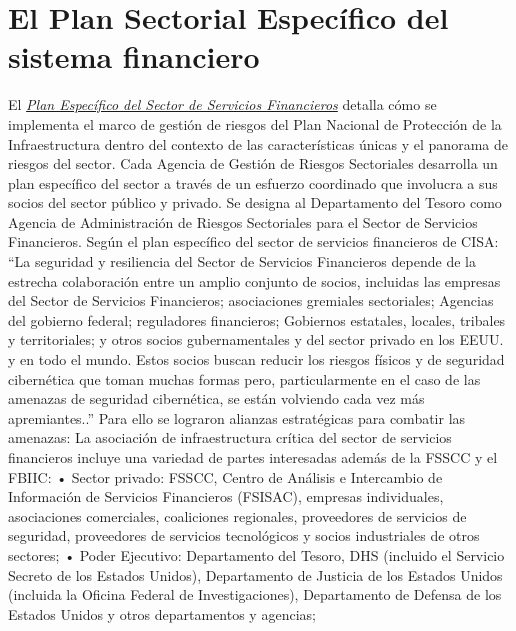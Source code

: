 \documentclass{article}
\begin{document}
\section{El Plan Sectorial Específico del sistema financiero}
El \href{https://www.cisa.gov/publication/nipp-ssp-financial-services-2015}{\textit{Plan Específico del Sector de Servicios Financieros}} detalla cómo se implementa el marco de gestión de riesgos del Plan Nacional de Protección de la Infraestructura dentro del contexto de las características únicas y el panorama de riesgos del sector. Cada Agencia de Gestión de Riesgos Sectoriales desarrolla un plan específico del sector a través de un esfuerzo coordinado que involucra a sus socios del sector público y privado. Se designa al Departamento del Tesoro como Agencia de Administración de Riesgos Sectoriales para el Sector de Servicios Financieros.
 \newline
Según el plan específico del sector de servicios financieros de CISA: 
\newline
“La seguridad y resiliencia del Sector de Servicios Financieros depende de la estrecha colaboración entre un amplio conjunto de socios, incluidas las empresas del Sector de Servicios Financieros; asociaciones gremiales sectoriales; Agencias del gobierno federal; reguladores financieros; Gobiernos estatales, locales, tribales y territoriales; y otros socios gubernamentales y del sector privado en los EEUU. y en todo el mundo. Estos socios buscan reducir los riesgos físicos y de seguridad cibernética que toman muchas formas pero, particularmente en el caso de las amenazas de seguridad cibernética, se están volviendo cada vez más apremiantes..”
\newline
\newline
Para ello se lograron alianzas estratégicas para combatir las amenazas:
La asociación de infraestructura crítica del sector de servicios financieros incluye una variedad de partes interesadas además de la FSSCC y el FBIIC:
\newline
\newline
• Sector privado: FSSCC, Centro de Análisis e Intercambio de Información de Servicios Financieros (FSISAC), empresas individuales, asociaciones comerciales, coaliciones regionales, proveedores de servicios de seguridad, proveedores de servicios tecnológicos y socios industriales de otros sectores;
\newline
\newline
• Poder Ejecutivo: Departamento del Tesoro, DHS (incluido el Servicio Secreto de los Estados Unidos), Departamento de Justicia de los Estados Unidos (incluida la Oficina Federal de Investigaciones), Departamento de Defensa de los Estados Unidos y otros departamentos y agencias;
\end{document}
